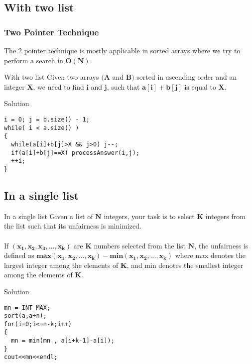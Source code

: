 \documentclass{beamer}
\begin{document}
\subsection{With two list }
\begin{frame}[fragile]
\frametitle{Two Pointer Technique}

 The 2 pointer technique is mostly applicable in sorted arrays where we try to perform a search in $\mathbf{O(N)}$.

 \begin{block}{With two list }
Given two arrays $\mathbf{(A}$ and $\mathbf{B)}$ sorted in ascending order and an integer $\mathbf{X}$, we need to find $\mathbf{i}$ and $\mathbf{j}$, such that $\mathbf{a[i] + b[j]}$ is equal to $\mathbf{X}$.
\end{block}

\begin{block}{Solution}
\begin{lstlisting}
i = 0; j = b.size() - 1;
while( i < a.size() )
{
  while(a[i]+b[j]>X && j>0) j--;
  if(a[i]+b[j]==X) processAnswer(i,j);
  ++i;
}
\end{lstlisting}
\end{block}

\end{frame}

\subsection{In a single list}
\begin{frame}[fragile]
 \begin{block}{In a single list}
Given a list of $\mathbf{N}$ integers, your task is to select $\mathbf{K}$ integers from the list such that its unfairness is minimized. 
\\~\\
If $(\mathbf{x_1,x_2,x_3,...,x_k})$ are $\mathbf{K}$ numbers selected from the list $\mathbf{N}$, the unfairness is defined as $ \mathbf{max(x_1,x_2,...,x_k) - min(x_1,x_2,...,x_k)}$ where max denotes the largest integer among the elements of $\mathbf{K}$, and min denotes the smallest integer among the elements of $\mathbf{K}$.
\end{block}

\begin{block}{Solution}
\begin{lstlisting}
mn = INT_MAX;
sort(a,a+n);
for(i=0;i<=n-k;i++)
{
  mn = min(mn , a[i+k-1]-a[i]);
}
cout<<mn<<endl;
\end{lstlisting}
\end{block}
\end{frame}
\end{document}

